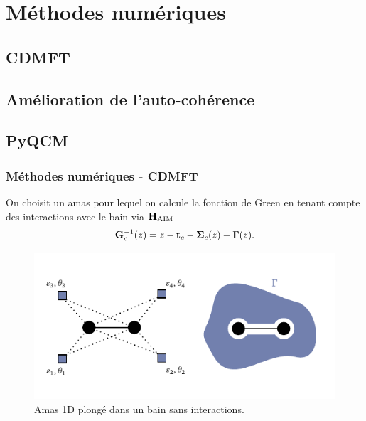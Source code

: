 
\section{Méthodes numériques}

\subsection{CDMFT}

\subsection{Amélioration de l'auto-cohérence}

\subsection{PyQCM}

\begin{frame}
    \begin{center}
    \vspace{0.5cm}
    \end{center}
\end{frame}

\begin{frame}
    \frametitle{Méthodes numériques - CDMFT}
    On choisit un amas pour lequel on calcule la fonction de Green en tenant
    compte des interactions avec le bain via $\vb{H}_{\text{AIM}}$
    \begin{align}
        \vb{G}_c^{-1}(z) = z - \vb{t}_c - \vb{\Sigma}_c(z) - \vb{\Gamma}(z).
    \end{align}
    \begin{figure}
         \centering
         \includegraphics[scale=0.75]{./figures/theory/1D_2s_4b_bulk.pdf}
         \caption{Amas 1D plongé dans un bain sans interactions.}
         \label{fig: amas_CDMFT}
    \end{figure}
\end{frame}

